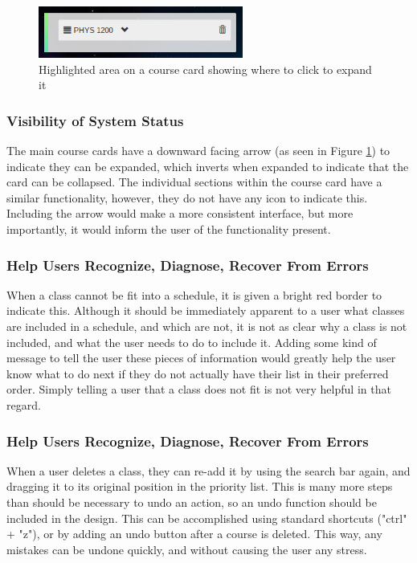 \documentclass{article}
\begin{document}
\begin{figure}[h!]
    \centering
    \includegraphics[width = 0.6\textwidth]{dragndrop}
    \caption{Highlighted area on a course card showing where to click to expand it}
    \label{fig:dragndrop}
\end{figure}


\subsubsection{Visibility of System Status}
The main course cards have a downward facing arrow (as seen in Figure \ref{fig:dragndrop}) to indicate they can be expanded, which inverts when expanded to indicate that the card can be collapsed. The individual sections within the course card have a similar functionality, however, they do not have any icon to indicate this. Including the arrow would make a more consistent interface, but more importantly, it would inform the user of the functionality present.




\subsubsection{Help Users Recognize, Diagnose, Recover From Errors}
When a class cannot be fit into a schedule, it is given a bright red border to indicate this. Although it should be immediately apparent to a user what classes are included in a schedule, and which are not, it is not as clear why a class is not included, and what the user needs to do to include it. Adding some kind of message to tell the user these pieces of information would greatly help the user know what to do next if they do not actually have their list in their preferred order. Simply telling a user that a class does not fit is not very helpful in that regard.



\subsubsection{Help Users Recognize, Diagnose, Recover From Errors}
When a user deletes a class, they can re-add it by using the search bar again, and dragging it to its original position in the priority list. This is many more steps than should be necessary to undo an action, so an undo function should be included in the design. This can be accomplished using standard shortcuts ("ctrl" + "z"), or by adding an undo button after a course is deleted. This way, any mistakes can be undone quickly, and without causing the user any stress.
\end{document}
